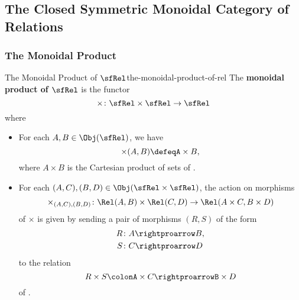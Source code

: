 \subsection{The Closed Symmetric Monoidal Category of Relations}\label{subsection-the-closed-symmetric-monoidal-category-of-relations}
\subsubsection{The Monoidal Product}\label{subsubsection-the-closed-symmetric-monoidal-category-of-relations-the-monoidal-product}
\begin{definition}{The Monoidal Product of $\sfRel$}{the-monoidal-product-of-rel}%
    The \textbf{monoidal product of $\sfRel$} is the functor
    \[
        \times%
        \colon%
        \sfRel\times\sfRel%
        \to%
        \sfRel%
    \]%
    where
    \begin{itemize}
        \item{}For each $A,B\in\Obj(\sfRel)$, we have%
            \[%
                \mathord{\times}(A,B)%
                \defeq%
                A\times B,%
            \]%
            where $A\times B$ is the Cartesian product of sets of .
        \item{}For each $(A,C),(B,D)\in\Obj(\sfRel\times\sfRel)$, the action on morphisms
            \[
                \times_{(A,C),(B,D)}%
                \colon%
                \Rel(A,B)\times\Rel(C,D)%
                \to%
                \Rel(A\times C,B\times D)%
            \]%
            of $\times$ is given by sending a pair of morphisms $(R,S)$ of the form
            \begin{align*}
                R &\colon A\rightproarrow B,\\
                S &\colon C\rightproarrow D
            \end{align*}
            to the relation
            \[
                R\times S%
                \colon%
                A\times C%
                \rightproarrow%
                B\times D%
            \]%
            of .
    \end{itemize}
\end{definition}
